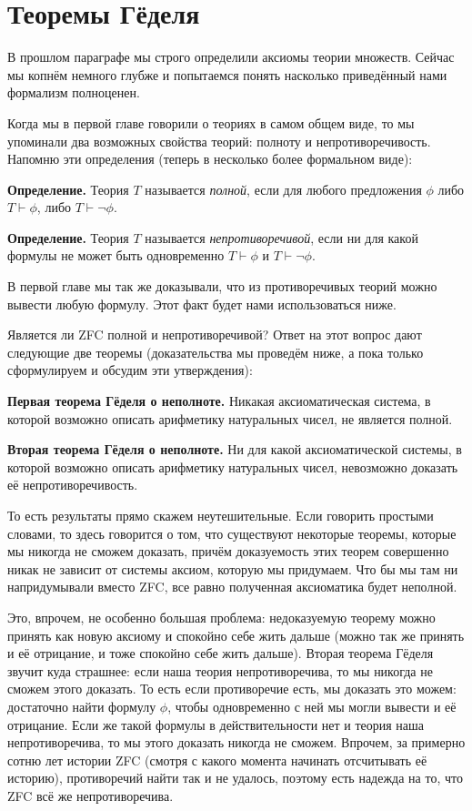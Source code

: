 \section{Теоремы Гёделя}

В прошлом параграфе мы строго определили аксиомы теории множеств. Сейчас мы копнём немного глубже и попытаемся понять насколько приведённый нами формализм полноценен.

Когда мы в первой главе говорили о теориях в самом общем виде, то мы упоминали два возможных свойства теорий: полноту и непротиворечивость. Напомню эти определения (теперь в несколько более формальном виде):

{\bfseries Определение.} Теория $T$ называется {\slshape полной}, если для любого предложения $\phi$ либо $T\vdash\phi$, либо $T\vdash\neg\phi$.

{\bfseries Определение.} Теория $T$ называется {\slshape непротиворечивой}, если ни для какой формулы не может быть одновременно $T\vdash \phi$ и $T\vdash\neg\phi$.

В первой главе мы так же доказывали, что из противоречивых теорий можно вывести любую формулу. Этот факт будет нами использоваться ниже.

Является ли ZFC полной и непротиворечивой? Ответ на этот вопрос дают следующие две теоремы (доказательства мы проведём ниже, а пока только сформулируем и обсудим эти утверждения):

{\bfseries Первая теорема Гёделя о неполноте.} Никакая аксиоматическая система, в которой возможно описать арифметику натуральных чисел, не является полной.

{\bfseries Вторая теорема Гёделя о неполноте.} Ни для какой аксиоматической системы, в которой возможно описать арифметику натуральных чисел, невозможно доказать её непротиворечивость.

То есть результаты прямо скажем неутешительные. Если говорить простыми словами, то здесь говорится о том, что существуют некоторые теоремы, которые мы никогда не сможем доказать, причём доказуемость этих теорем совершенно никак не зависит от системы аксиом, которую мы придумаем. Что бы мы там ни напридумывали вместо ZFC, все равно полученная аксиоматика будет неполной.

Это, впрочем, не особенно большая проблема: недоказуемую теорему можно принять как новую аксиому и спокойно себе жить дальше (можно так же принять и её отрицание, и тоже спокойно себе жить дальше). Вторая теорема Гёделя звучит куда страшнее: если наша теория непротиворечива, то мы никогда не сможем этого доказать. То есть если противоречие есть, мы доказать это можем: достаточно найти формулу $\phi$, чтобы одновременно с ней мы могли вывести и её отрицание. Если же такой формулы в действительности нет и теория наша непротиворечива, то мы этого доказать никогда не сможем. Впрочем, за примерно сотню лет истории ZFC (смотря с какого момента начинать отсчитывать её историю), противоречий найти так и не удалось, поэтому есть надежда на то, что ZFC всё же непротиворечива.

